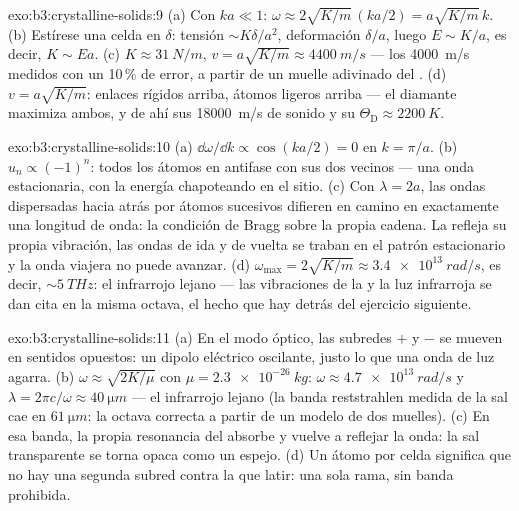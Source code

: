 \begin{solution}{exo:b3:crystalline-solids:9}
(a) Con $ka \ll 1$: $\omega \approx 2\sqrt{K/m}\,(ka/2) =
a\sqrt{K/m}\,k$. (b) Estírese una celda en $\delta$: tensión $\sim
K\delta/a^2$, deformación $\delta/a$, luego $E \sim K/a$, es decir, $K \sim
Ea$. (c) $K \approx \qty{31}{N/m}$, $v = a\sqrt{K/m} \approx
\qty{4400}{m/s}$ --- los \qty{4000}{m/s} medidos con un 10\,\% de error,
a partir de un muelle adivinado del . (d) $v = a\sqrt{K/m}$:
enlaces rígidos arriba, átomos ligeros arriba --- el diamante maximiza ambos, y de ahí
sus \qty{18000}{m/s} de sonido y su $\Theta_{\text{D}} \approx
\qty{2200}{K}$.
\end{solution}

\begin{solution}{exo:b3:crystalline-solids:10}
(a) $\dd\omega/\dd k \propto \cos(ka/2) = 0$ en $k = \pi/a$. (b)
$u_n \propto (-1)^n$: todos los átomos en antifase con sus dos
vecinos --- una onda estacionaria, con la energía chapoteando en el sitio. (c)
Con $\lambda = 2a$, las ondas dispersadas hacia atrás por átomos sucesivos
difieren en camino en exactamente una longitud de onda: la condición de Bragg
sobre la propia cadena. La  refleja su propia vibración, las ondas de ida
y de vuelta se traban en el patrón estacionario y
la onda viajera no puede avanzar. (d) $\omega_{\text{max}} = 2\sqrt{K/m} \approx
\qty{3.4e13}{rad/s}$, es decir, $\sim\qty{5}{THz}$: el infrarrojo lejano
--- las vibraciones de la  y la luz infrarroja se dan cita en la misma octava,
el hecho que hay detrás del ejercicio siguiente.
\end{solution}

\begin{solution}{exo:b3:crystalline-solids:11}
(a) En el modo óptico, las subredes $+$ y $-$ se mueven en sentidos
opuestos: un dipolo eléctrico oscilante, justo lo que una onda de luz
agarra. (b) $\omega \approx \sqrt{2K/\mu}$ con $\mu =
\qty{2.3e-26}{kg}$: $\omega \approx \qty{4.7e13}{rad/s}$ y
$\lambda = 2\pi c/\omega \approx \qty{40}{\micro m}$ --- el infrarrojo
lejano (la banda reststrahlen medida de la sal cae en
$\qty{61}{\micro m}$: la octava correcta a partir de un modelo de dos muelles). (c)
En esa banda, la propia resonancia del  absorbe y vuelve a reflejar
la onda: la sal transparente se torna opaca como un espejo. (d) Un átomo por
celda significa que no hay una segunda subred contra la que latir: una sola rama,
sin banda prohibida.
\end{solution}

